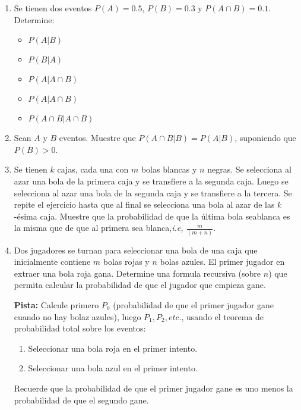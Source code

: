 \documentclass[dvipsnames,a4paper]{book}
\begin{document}
\begin{enumerate}[{Ej1. }]
\item Se tienen dos eventos \(P\left(A\right)=0.5\), \(P\left(B\right)=0.3\) y \(P\left(A\cap B\right)=0.1\). Determine:
    \begin{itemize}
        \item \(P\left(A|B\right)\)
        \item \(P\left(B|A\right)\)
         \item \(P\left(A|A\cap B\right)\)
         \item \(P\left(A|A\cap B\right)\)
         \item \(P\left(A\cap B|A\cap B\right)\)
    \end{itemize}




\item Sean \(A\) y \(B\) eventos. Muestre que \(P\left(A\cap B|B\right)=P\left(A|B\right)\), suponiendo que \(P\left(B\right)>0\).








\item Se tienen \(k\) cajas, cada una con \(m\) bolas blancas y \(n\) negras. Se selecciona al azar una bola de la primera caja y se transfiere a la segunda caja. Luego se selecciona al azar una bola de la segunda caja y se transfiere a la tercera. Se repite el ejercicio hasta que al final se selecciona una bola al azar de las \(k\)-ésima caja. Muestre que la probabilidad de que la última bola seablanca es la misma que de que al primera sea blanca,\textit{i.e, \(\frac{m}{\left(m+n\right) }\)}.









\item Dos jugadores se turnan para seleccionar una bola de una caja que
    inicialmente contiene {\color{red} \(m\) bolas rojas} y
    {\color{MidnightBlue} \(n\) bolas azules}. El primer jugador en extraer una
    {\color{red} bola roja gana}. Determine una formula recursiva (sobre
    {\color{MidnightBlue} \(n\)}) que permita calcular la probabilidad de que
    el jugador que empieza gane.

    \textbf{Pista:} Calcule primero \(P_0\) (probabilidad de que el primer jugador gane cuando no hay {\color{MidnightBlue} bolaz azules}), luego \(P_1,P_2,etc.\), usando el teorema de probabilidad total sobre los eventos:
    \begin{enumerate}[{(1) }]
        \item Seleccionar una bola roja en el primer intento.
        \item Seleccionar una {\color{MidnightBlue} bola azul} en el primer
            intento.
    \end{enumerate}
Recuerde que la probabilidad de que el primer jugador gane es uno menos la
probabilidad de que el segundo gane.


\end{enumerate}
\end{document}
